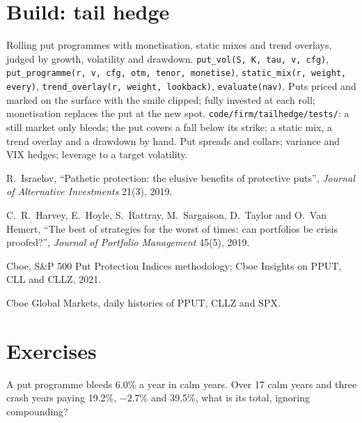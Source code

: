 \section{Build: tail hedge}\label{bld:s2:tail-hedging-and-long-volatility:tailhedge}

\begin{build}
 Rolling put programmes with monetisation, static mixes and trend overlays, judged by growth, volatility and drawdown.
 \texttt{put\_vol(S, K, tau, v, cfg)}, \texttt{put\_programme(r, v, cfg, otm, tenor, monetise)}, \texttt{static\_mix(r, weight,
every)}, \texttt{trend\_overlay(r, weight, lookback)}, \texttt{evaluate(nav)}.
 Puts priced and marked on the surface with the smile clipped; fully invested at each roll; monetisation replaces the put at the new
spot.
 \texttt{code/firm/tailhedge/tests/}: a still market only bleeds; the put covers a fall below its strike; a static mix, a
trend overlay and a drawdown by hand.
 Put spreads and collars; variance and VIX hedges; leverage to a target volatility.
\end{build}

\begin{omsources}
\item R.~Israelov, ``Pathetic protection: the elusive benefits of protective puts'', \emph{Journal of Alternative Investments} 21(3), 2019.
\item C.~R.~Harvey, E.~Hoyle, S.~Rattray, M.~Sargaison, D.~Taylor and O.~Van Hemert, ``The best of strategies for the worst of times: can portfolios be
crisis proofed?'', \emph{Journal of Portfolio Management} 45(5), 2019.
\item Cboe, S\&P 500 Put Protection Indices methodology; Cboe Insights on PPUT, CLL and CLLZ, 2021.
\item Cboe Global Markets, daily histories of PPUT, CLLZ and SPX.
\end{omsources}

\section{Exercises}

\begin{exercise}[$\star$]\label{exo:s2:tail-hedging-and-long-volatility:1}
A put programme bleeds 6.0\% a year in calm years. Over 17 calm years and three crash years paying 19.2\%, $-2.7\%$ and 39.5\%, what is its total,
ignoring compounding?
\end{exercise}

